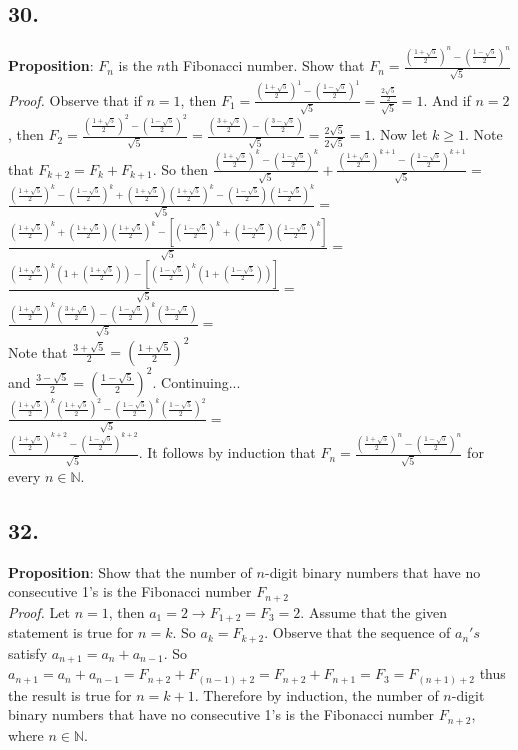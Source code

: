 \documentclass[12pt]{article}
\begin{document}
	\begin{minipage}[t]{0.45\textwidth}
		
		
		\subsection*{30.}
		\textbf{Proposition}: $F_n$ is the $n$th Fibonacci number. Show that $ F_n=\frac{(\frac{1+\sqrt{5}}{2})^n-(\frac{1-\sqrt{5}}{2})^n}{\sqrt{5}}  $
		\textit{Proof.} Observe that if $ n=1 $, then $ F_1=\frac{(\frac{1+\sqrt{5}}{2})^1-(\frac{1-\sqrt{5}}{2})^1}{\sqrt{5}} = \frac{\frac{2\sqrt{5}}{2}}{\sqrt{5}} = 1 $. And if $ n=2 $, then $F_2=\frac{(\frac{1+\sqrt{5}}{2})^2-(\frac{1-\sqrt{5}}{2})^2}{\sqrt{5}} = \frac{(\frac{3+\sqrt{5}}{2})-(\frac{3-\sqrt{5}}{2})}{\sqrt{5}} = \frac{2\sqrt{5}}{2\sqrt{5}} = 1 $. Now let $ k\geq 1 $. Note that $ F_{k+2}=F_k+F_{k+1} $. So then
		$ \frac{(\frac{1+\sqrt{5}}{2})^k-(\frac{1-\sqrt{5}}{2})^k}{\sqrt{5}}+\frac{(\frac{1+\sqrt{5}}{2})^{k+1}-(\frac{1-\sqrt{5}}{2})^{k+1}}{\sqrt{5}} = $
		$ \frac{(\frac{1+\sqrt{5}}{2})^k - (\frac{1-\sqrt{5}}{2})^k + (\frac{1+\sqrt{5}}{2})(\frac{1+\sqrt{5}}{2})^k - (\frac{1-\sqrt{5}}{2})(\frac{1-\sqrt{5}}{2})^k}{\sqrt{5}} = $
		$ \frac{(\frac{1+\sqrt{5}}{2})^k + (\frac{1+\sqrt{5}}{2})(\frac{1+\sqrt{5}}{2})^k -[(\frac{1-\sqrt{5}}{2})^k+(\frac{1-\sqrt{5}}{2})(\frac{1-\sqrt{5}}{2})^k]}{\sqrt{5}} =$
		$ \frac{(\frac{1+\sqrt{5}}{2})^k(1+(\frac{1+\sqrt{5}}{2}))-[(\frac{1-\sqrt{5}}{2})^k(1+(\frac{1-\sqrt{5}}{2}))]}{\sqrt{5}} = $
		$ \frac{(\frac{1+\sqrt{5}}{2})^k(\frac{3+\sqrt{5}}{2}) - (\frac{1-\sqrt{5}}{2})^k(\frac{3-\sqrt{5}}{2})}{\sqrt{5}} =$\\
		Note that $ \frac{3+\sqrt{5}}{2} = (\frac{1+\sqrt{5}}{2})^2 $ \\and $ \frac{3-\sqrt{5}}{2} = (\frac{1-\sqrt{5}}{2})^2 $. Continuing...\\
		$ \frac{(\frac{1+\sqrt{5}}{2})^k(\frac{1+\sqrt{5}}{2})^2 - (\frac{1-\sqrt{5}}{2})^k(\frac{1-\sqrt{5}}{2})^2}{\sqrt{5}} =$\\
		$ \frac{(\frac{1+\sqrt{5}}{2})^{k+2}-(\frac{1-\sqrt{5}}{2})^{k+2}}{\sqrt{5}}$.
		It follows by induction that $ F_n=\frac{(\frac{1+\sqrt{5}}{2})^n-(\frac{1-\sqrt{5}}{2})^n}{\sqrt{5}}  $ for every $ n\in\mathbb{N} $.
		
		
		\subsection*{32.}
		\textbf{Proposition}: Show that the number of $ n $-digit binary numbers that have no consecutive
		1's is the Fibonacci number $  F_{n+2} $\\
		\textit{Proof.} Let $ n=1 $, then $ a_1=2\rightarrow F_{1+2}=F_3=2 $. Assume that the given statement is true for $ n=k $. So $ a_k=F_{k+2} $. Observe that the sequence of $ a_n's $ satisfy $ a_{n+1}=a_n+a_{n-1} $. So $ a_{n+1}=a_n+a_{n-1} = F_{n+2}+F_{(n-1)+2} = F_{n+2}+F_{n+1}= F_3 = F_{(n+1)+2}$ thus the result is true for $ n=k+1 $. Therefore by induction, the number of $ n $-digit binary numbers that have no consecutive
		1's is the Fibonacci number $  F_{n+2} $, where $ n\in\mathbb{N} $.
		
		
		
		
	\end{minipage}
	\pagebreak
	
	
\end{document}
